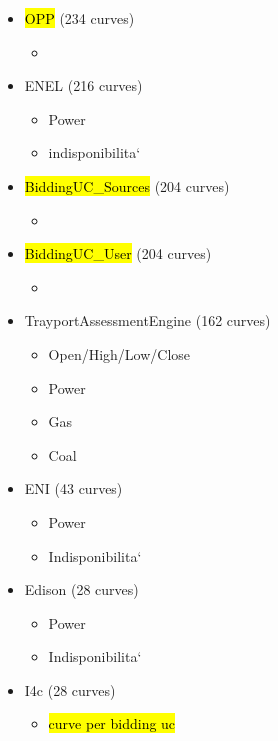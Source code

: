 \begin{itemize}
\begin{itemize}
        \end{itemize}
    \item \hl{OPP} (234 curves)
        \begin{itemize}
            \item 
        \end{itemize}
    \item ENEL (216 curves)
        \begin{itemize}
            \item Power
            \item indisponibilita`
        \end{itemize}
    \item \hl{BiddingUC\_Sources} (204 curves)
        \begin{itemize}
            \item 
        \end{itemize}
    \item \hl{BiddingUC\_User} (204 curves)
        \begin{itemize}
            \item 
        \end{itemize}
    \item TrayportAssessmentEngine (162 curves)
        \begin{itemize}
            \item Open/High/Low/Close
            \item Power
            \item Gas
            \item Coal
        \end{itemize}
    \item ENI (43 curves)
        \begin{itemize}
            \item Power
            \item Indisponibilita`
        \end{itemize}
    \item Edison (28 curves)
        \begin{itemize}
            \item Power
            \item Indisponibilita`
        \end{itemize}
    \item I4c (28 curves)
        \begin{itemize}
            \item \hl{curve per bidding uc}
        \end{itemize}

\end{itemize}
